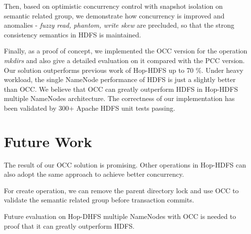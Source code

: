 \noindent Then, based on optimistic concurrency control with snapshot isolation on semantic related group, we demonstrate how concurrency is improved and anomalies - \textit{fuzzy read, phantom, write skew} are precluded, so that the strong consistency semantics in HDFS is maintained.

\noindent Finally, as a proof of concept, we implemented the OCC version for the operation \textit{mkdirs} and also give a detailed evaluation on it compared with the PCC version. Our solution outperforms previous work of Hop-HDFS up to 70 \%. Under heavy workload, the single NameNode performance of HDFS is just a slightly better than OCC. We believe that OCC can greatly outperform HDFS in Hop-HDFS multiple NameNodes architecture. The correctness of our implementation has been validated by 300+ Apache HDFS unit tests passing.


\section{Future Work}

The result of our OCC solution is promising. Other operations in Hop-HDFS can also adopt the same approach to achieve better concurrency.

\noindent For create operation, we can remove the parent directory lock and use OCC to validate the semantic related group before transaction commits.

\noindent Future evaluation on Hop-DHFS multiple NameNodes with OCC is needed to proof that it can greatly outperform HDFS.

